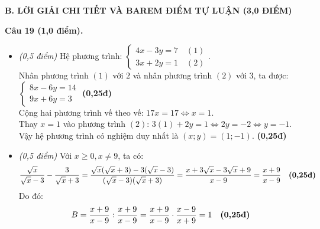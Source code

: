 \documentclass[11pt,a4paper]{article}
\begin{document}
\vspace{3mm}
\noindent
\textbf{\large B. LỜI GIẢI CHI TIẾT VÀ BAREM ĐIỂM TỰ LUẬN (3,0 ĐIỂM)}

\vspace{2mm}
\noindent
\textbf{Câu 19 (1,0 điểm).}
\begin{itemize}
  \item[a)] \textit{(0,5 điểm)} Hệ phương trình: $\begin{cases} 4x - 3y = 7 \quad (1) \\ 3x + 2y = 1 \quad (2) \end{cases}$.\\
  Nhân phương trình $(1)$ với $2$ và nhân phương trình $(2)$ với $3$, ta được:
  $\begin{cases} 8x - 6y = 14 \\ 9x + 6y = 3 \end{cases}$ \dotfill \textbf{(0,25đ)}\\
  Cộng hai phương trình vế theo vế: $17x = 17 \iff x = 1$.\\
  Thay $x = 1$ vào phương trình $(2)$: $3(1) + 2y = 1 \iff 2y = -2 \iff y = -1$.\\
  Vậy hệ phương trình có nghiệm duy nhất là $(x; y) = (1; -1)$. \dotfill \textbf{(0,25đ)}

  \item[b)] \textit{(0,5 điểm)} Với $x \ge 0, x \ne 9$, ta có:
  \[
  \dfrac{\sqrt{x}}{\sqrt{x}-3} - \dfrac{3}{\sqrt{x}+3} = \dfrac{\sqrt{x}(\sqrt{x}+3) - 3(\sqrt{x}-3)}{(\sqrt{x}-3)(\sqrt{x}+3)} = \dfrac{x + 3\sqrt{x} - 3\sqrt{x} + 9}{x - 9} = \dfrac{x+9}{x-9} \quad \text{\textbf{(0,25đ)}}
  \]
  Do đó:
  \[
  B = \dfrac{x+9}{x-9} : \dfrac{x+9}{x-9} = \dfrac{x+9}{x-9} \cdot \dfrac{x-9}{x+9} = 1 \quad \text{\textbf{(0,25đ)}}
  \]
\end{itemize}
\end{document}
